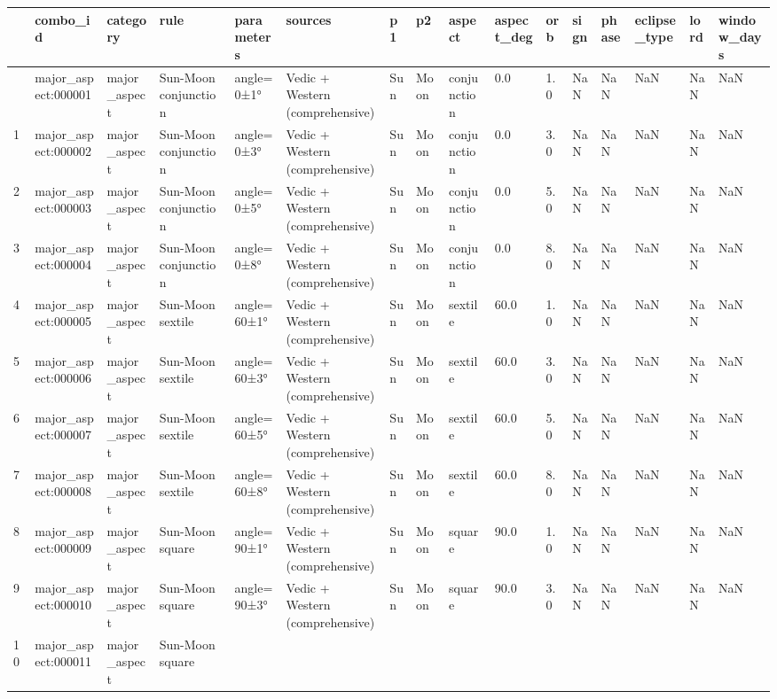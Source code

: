 \documentclass[
  11pt,
  a4paper,
  oneside,
  openany]{article}
\begin{document}
\label{gold-astro-catalog}
\begin{longtable}[]{@{}llllllllllllllll@{}}
\toprule\noalign{}
& combo\_id & category & rule & parameters & sources & p1 & p2 & aspect
& aspect\_deg & orb & sign & phase & eclipse\_type & lord &
window\_days \\
\midrule\noalign{}
\endhead
\bottomrule\noalign{}
\endlastfoot
0 & major\_aspect:000001 & major\_aspect & Sun-Moon conjunction &
angle=0±1° & Vedic + Western (comprehensive) & Sun & Moon & conjunction
& 0.0 & 1.0 & NaN & NaN & NaN & NaN & NaN \\
1 & major\_aspect:000002 & major\_aspect & Sun-Moon conjunction &
angle=0±3° & Vedic + Western (comprehensive) & Sun & Moon & conjunction
& 0.0 & 3.0 & NaN & NaN & NaN & NaN & NaN \\
2 & major\_aspect:000003 & major\_aspect & Sun-Moon conjunction &
angle=0±5° & Vedic + Western (comprehensive) & Sun & Moon & conjunction
& 0.0 & 5.0 & NaN & NaN & NaN & NaN & NaN \\
3 & major\_aspect:000004 & major\_aspect & Sun-Moon conjunction &
angle=0±8° & Vedic + Western (comprehensive) & Sun & Moon & conjunction
& 0.0 & 8.0 & NaN & NaN & NaN & NaN & NaN \\
4 & major\_aspect:000005 & major\_aspect & Sun-Moon sextile &
angle=60±1° & Vedic + Western (comprehensive) & Sun & Moon & sextile &
60.0 & 1.0 & NaN & NaN & NaN & NaN & NaN \\
5 & major\_aspect:000006 & major\_aspect & Sun-Moon sextile &
angle=60±3° & Vedic + Western (comprehensive) & Sun & Moon & sextile &
60.0 & 3.0 & NaN & NaN & NaN & NaN & NaN \\
6 & major\_aspect:000007 & major\_aspect & Sun-Moon sextile &
angle=60±5° & Vedic + Western (comprehensive) & Sun & Moon & sextile &
60.0 & 5.0 & NaN & NaN & NaN & NaN & NaN \\
7 & major\_aspect:000008 & major\_aspect & Sun-Moon sextile &
angle=60±8° & Vedic + Western (comprehensive) & Sun & Moon & sextile &
60.0 & 8.0 & NaN & NaN & NaN & NaN & NaN \\
8 & major\_aspect:000009 & major\_aspect & Sun-Moon square & angle=90±1°
& Vedic + Western (comprehensive) & Sun & Moon & square & 90.0 & 1.0 &
NaN & NaN & NaN & NaN & NaN \\
9 & major\_aspect:000010 & major\_aspect & Sun-Moon square & angle=90±3°
& Vedic + Western (comprehensive) & Sun & Moon & square & 90.0 & 3.0 &
NaN & NaN & NaN & NaN & NaN \\
10 & major\_aspect:000011 & major\_aspect & Sun-Moon square &

\end{longtable}
\end{document}
